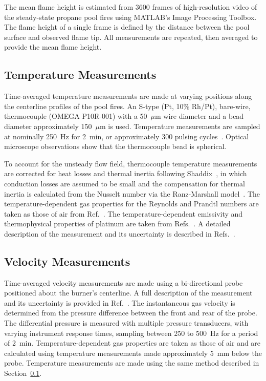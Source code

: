 \documentclass[12pt]{ussci}
\begin{document}
The mean flame height is estimated from 3600 frames of high-resolution video of the steady-state propane pool fires using MATLAB's Image Processing Toolbox. The flame height of a single frame is defined by the distance between the pool surface and observed flame tip. All measurements are repeated, then averaged to provide the mean flame height. 

\subsection{Temperature Measurements}\label{ssec:Temp_Meas}
Time-averaged temperature measurements are made at varying positions along the centerline profiles of the pool fires. An S-type (Pt, 10\% Rh/Pt), bare-wire, thermocouple (OMEGA P10R-001) with a 50~$\mu$m wire diameter and a bead diameter approximately 150~$\mu$m is used. Temperature measurements are sampled at nominally 250~Hz for 2~min, or approximately 300 pulsing cycles~\cite{Falkenstein2021a}. Optical microscope observations show that the thermocouple bead is spherical. 

To account for the unsteady flow field, thermocouple temperature measurements are corrected for heat losses and thermal inertia following Shaddix~\cite{Shaddix2001}, in which conduction losses are assumed to be small and the compensation for thermal inertia is calculated from the Nusselt number via the Ranz-Marshall model~\cite{Shaddix1999}. The temperature-dependent gas properties for the Reynolds and Prandtl numbers are taken as those of air from Ref.~\cite{Incropera2011}.  The temperature-dependent emissivity and thermophysical properties of platinum are taken from Refs.~\cite{Platinum2010, Jaeger1939}. A detailed description of the measurement and its uncertainty is described in Refs.~\cite{Sung2020}. 

\subsection{Velocity Measurements}
Time-averaged velocity measurements are made using a bi-directional probe positioned about the burner's centerline. A full description of the measurement and its uncertainty is provided in Ref.~\cite{Sung2021}. The instantaneous gas velocity is determined from the pressure difference between the front and rear of the probe. The differential pressure is measured with multiple pressure transducers, with varying instrument response times, sampling between 250 to 500~Hz for a period of 2~min. Temperature-dependent gas properties are taken as those of air and are calculated using temperature measurements made approximately 5~mm below the probe. Temperature measurements are made using the same method described in Section~\ref{ssec:Temp_Meas}. 
\end{document}
